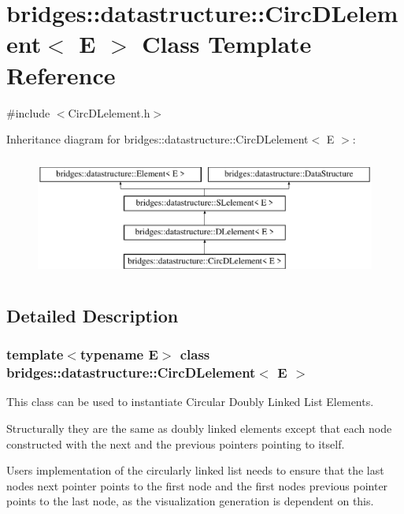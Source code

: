 \hypertarget{classbridges_1_1datastructure_1_1_circ_d_lelement}{}\section{bridges\+:\+:datastructure\+:\+:Circ\+D\+Lelement$<$ E $>$ Class Template Reference}
\label{classbridges_1_1datastructure_1_1_circ_d_lelement}


{\ttfamily \#include $<$Circ\+D\+Lelement.\+h$>$}

Inheritance diagram for bridges\+:\+:datastructure\+:\+:Circ\+D\+Lelement$<$ E $>$\+:\begin{figure}[H]
\begin{center}
\leavevmode
\includegraphics[height=4.000000cm]{classbridges_1_1datastructure_1_1_circ_d_lelement}
\end{center}
\end{figure}


\subsection{Detailed Description}
\subsubsection*{template$<$typename E$>$\newline
class bridges\+::datastructure\+::\+Circ\+D\+Lelement$<$ E $>$}

This class can be used to instantiate Circular Doubly Linked List Elements. 

Structurally they are the same as doubly linked elements except that each node constructed with the next and the previous pointers pointing to itself.

User\textquotesingle{}s implementation of the circularly linked list needs to ensure that the last node\textquotesingle{}s next pointer points to the first node and the first node\textquotesingle{}s previous pointer points to the last node, as the visualization generation is dependent on this.

